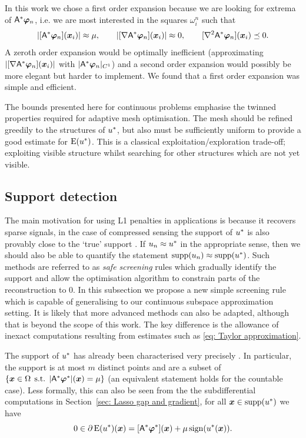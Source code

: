 \documentclass[smallextended]{svjour3}
\newcommand{\op}[1]{\operatorname{#1}}
\newcommand{\1}{\F{1}}
\DeclareMathOperator{\st}{\;s.t.\;}
\DeclareMathOperator{\supp}{supp}
\DeclareMathOperator{\sign}{sign}
\newcommand{\Domain}{\Omega}\newcommand{\domain}{\omega}
\newcommand*{\var}[1]{%
	\IfEqCase{#1}{%
		{0}{u}%
		{1}{v}%
		{2}{w}%
	}[u#1]%
}
\begin{document}
	In this work we chose a first order expansion because we are looking for extrema of $\A^*\vec{\varphi}_n$, i.e. we are most interested in the squares $\domain_i^n$ such that 
	\begin{equation}
		|[\A^*\vec{\varphi}_n](\vec{x}_i)| \approx \mu, \qquad |[\nabla\A^*\vec{\varphi}_n](\vec{x}_i)| \approx 0, \qquad [\nabla^2\A^*\vec{\varphi}_n](\vec{x}_i) \preceq 0. 
	\end{equation}
	A zeroth order expansion would be optimally inefficient (approximating $|[\nabla\A^*\vec{\varphi}_n](\vec{x}_i)|$ with $|\A^*\vec{\varphi}_n|_{C^1}$) and a second order expansion would possibly be more elegant but harder to implement. We found that a first order expansion was simple and efficient.
	
	The bounds presented here for continuous problems emphasise the twinned properties required for adaptive mesh optimisation. The mesh should be refined greedily to the structures of $\var0^*$, but also must be sufficiently uniform to provide a good estimate for $\op{E}(\var0^*)$. This is a classical exploitation/exploration trade-off; exploiting visible structure whilst searching for other structures which are not yet visible.
	
	
	
	\subsection{Support detection}\label{sec: support detection}
	The main motivation for using L1 penalties in applications is because it recovers sparse signals, in the case of compressed sensing the support of $\var0^*$ is also provably close to the `true' support \cite{Duval2017a,Poon2018}. If $\var0_n\approx \var0^*$ in the appropriate sense, then we should also be able to quantify the statement $\op{supp}(\var0_n)\approx\op{supp}(\var0^*)$. Such methods are referred to as \emph{safe screening} rules \cite{ElGhaoui2010} which gradually identify the support and allow the optimisation algorithm to constrain parts of the reconstruction to 0. In this subsection we propose a new simple screening rule which is capable of generalising to our continuous subspace approximation setting. It is likely that more advanced methods \cite{Bonnefoy2015,Ndiaye2017} can also be adapted, although that is beyond the scope of this work. The key difference is the allowance of inexact computations resulting from estimates such as \eqref{eq: Taylor approximation}.
	
	The support of $\var0^*$ has already been characterised very precisely \cite{Duval2017a,Poon2018}. In particular, the support is at most $m$ distinct points and are a subset of $\{ \vec{x}\in\Domain \st |\A^*\vec{\varphi}^*|(\vec{x}) = \mu\} $ (an equivalent statement holds for the countable case). Less formally, this can also be seen from the the subdifferential computations in Section~\ref{sec: Lasso gap and gradient}, for all $\vec{x}\in\supp(\var0^*)$ we have
	\begin{equation}
		0\in \partial \op{E}(\var0^*)(\vec{x}) = [\A^*\vec{\varphi}^*](\vec{x}) + \mu\sign(\var0^*(\vec{x})).
	\end{equation}
	
\end{document}
